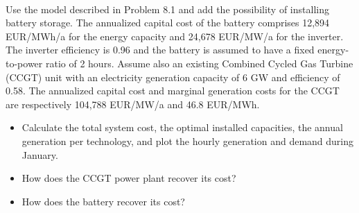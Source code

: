 \documentclass[10pt]{article}
\newenvironment{problem}[2][Problem]{\begin{trivlist}
\item[\hskip \labelsep {\bfseries #1}\hskip \labelsep {\bfseries #2.}]}{\end{trivlist}}
\begin{document}
\

\begin{problem}{8.2}
Use the model described in Problem 8.1 and add the possibility of installing battery storage. The annualized capital cost of the battery comprises  12,894 EUR/MWh/a for the energy capacity and 24,678 EUR/MW/a for the inverter. The inverter efficiency is 0.96 and the battery is assumed to have a fixed energy-to-power ratio of 2 hours. Assume also an existing Combined Cycled Gas Turbine (CCGT) unit with an electricity generation capacity of 6 GW and efficiency of 0.58. The annualized capital cost and marginal generation costs for the CCGT are respectively 104,788 EUR/MW/a and 46.8 EUR/MWh.

\begin{itemize}
\item[a)] Calculate the total system cost, the optimal installed capacities, the annual generation per technology, and plot the hourly generation and demand during January.

\item[b)] How does the CCGT power plant recover its cost?

\item[c)] How does the battery recover its cost?

\end{itemize}

\end{problem}



\end{document}
